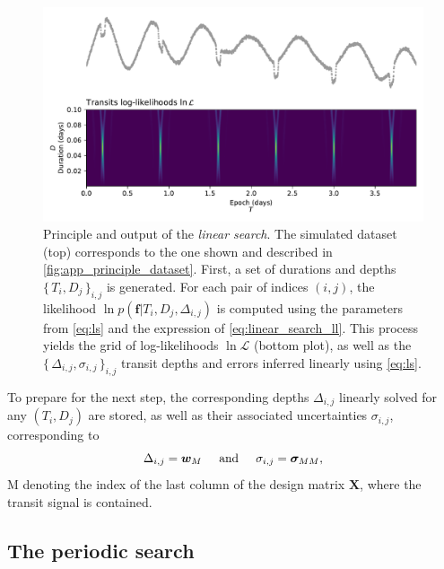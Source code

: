\documentclass[modern]{aastex631}
\newcommand{\set}[1]{\{\,#1\,\}}
\begin{document}
\begin{figure}[H]
    \begin{centering}
        \includegraphics[width=\linewidth]{../workflows/principle/figures/principle_linear_search.pdf}
        \caption{Principle and output of the \textit{linear search}. The simulated dataset (top) corresponds to the one shown and described in \autoref{fig:app_principle_dataset}. First, a set of durations and depths $\set{T_i, D_j}_{i,j}$ is generated. For each pair of indices $(i,j)$, the likelihood $\ln p(\bm{f} \vert T_i ,D_j, \Delta_{i,j})$ is computed using the parameters from \autoref{eq:ls} and the expression of \autoref{eq:linear_search_ll}. This process yields the grid of log-likelihoods $\ln\mathcal{L}$ (bottom plot), as well as the $\set{\Delta_{i,j}, \sigma_{i,j}}_{i, j}$ transit depths and errors inferred linearly using \autoref{eq:ls}.}
        \label{fig:linear_search}
    \end{centering}
\end{figure}

\noindent To prepare for the next step, the corresponding depths $\Delta_{i,j}$ linearly solved for any $(T_i ,D_j)$ are stored, as well as their associated uncertainties $\sigma_{i,j}$, corresponding to
\begin{equation*}
    \Delta_{i,j} = \bm{w}_M \hspace{0.5cm}\text{and}\hspace{0.5cm} \sigma_{i,j} = \bm{\sigma}_{MM},
\end{equation*}
M denoting the index of the last column of the design matrix $\bm{X}$, where the transit signal is contained.

\subsection{The periodic search}
\end{document}
